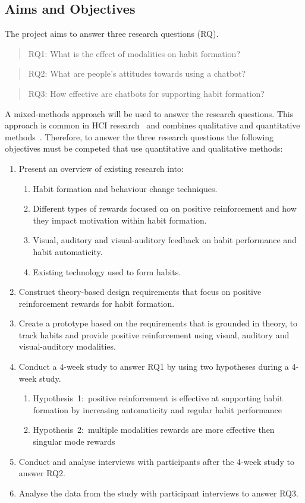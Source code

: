 \subsection{Aims and Objectives}
The project aims to answer three research questions (RQ).

\begin{quote}
RQ1: What is the effect of modalities on habit formation?
\end{quote}
\begin{quote}
RQ2: What are people's attitudes towards using a chatbot?
\end{quote}
\begin{quote}
RQ3: How effective are chatbots for supporting habit formation?
\end{quote}

A mixed-methods approach will be used to answer the research questions. This approach is common in HCI research~\cite{hci_mixed_methods} and combines qualitative and quantitative methods~\cite{hci_mixed_methods_2}. Therefore, to answer the three research questions the following objectives must be competed that use quantitative and qualitative methods:

\begin{enumerate}
    \item Present an overview of existing research into:
      \begin{enumerate}
        \item Habit formation and behaviour change techniques.
        \item Different types of rewards focused on on positive reinforcement and how they impact motivation within habit formation.
        \item Visual, auditory and visual-auditory feedback on habit performance and habit automaticity.
        \item Existing technology used to form habits.
      \end{enumerate}
    \item Construct theory-based design requirements that focus on positive reinforcement rewards for habit formation.
    \item Create a prototype based on the requirements that is grounded in theory, to track habits and provide positive reinforcement using visual, auditory and visual-auditory modalities.
    \item Conduct a 4-week study to answer RQ1 by using two hypotheses during a 4-week study.
    \begin{enumerate}
        \item Hypothesis~1:~positive reinforcement is effective at supporting habit formation by increasing automaticity and regular habit performance
        \item Hypothesis~2:~multiple modalities rewards are more effective then singular mode rewards
    \end{enumerate}
    \item Conduct and analyse interviews with participants after the 4-week study to answer RQ2.
    \item Analyse the data from the study with participant interviews to answer RQ3.
\end{enumerate}


